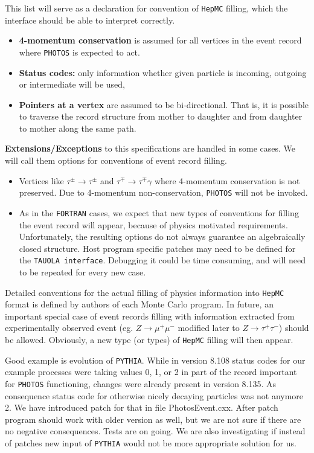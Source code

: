 \documentclass[]{Photos_interface_design}
\begin{document}
This list will serve as a declaration for convention of  {\tt HepMC} filling, which  the 
interface should  be able to interpret correctly.

\begin{itemize}
  \item \textbf{4-momentum conservation} is assumed for all vertices in the event record where {\tt PHOTOS} is expected to act.
  \item \textbf{Status codes:} only information whether given particle is incoming, outgoing or intermediate will be used,
  \item \textbf{Pointers at a vertex} are assumed to be bi-directional. That is, it is possible to traverse the record structure from mother to daughter and from daughter to mother along the same path.
\end{itemize}

\noindent
\textbf{ Extensions/Exceptions} to this specifications  are handled in some cases. We will call them
options for conventions of event record filling.
  \begin{itemize} 
    \item  Vertices like $\tau^\pm \rightarrow \tau^\pm$ and $\tau^\mp \rightarrow \tau^\mp \gamma$ 
           where 4-momentum conservation is not preserved. Due to 4-momentum non-conservation,
           {\tt PHOTOS} will not be invoked.
    \item
           As in the {\tt FORTRAN} cases, we expect that  new  types of 
           conventions for filling the event record
           will appear, because of physics motivated requirements.
           Unfortunately, the resulting options do not always guarantee
           an algebraically closed structure.  
           Host program specific patches  may need to be defined for the 
           {\tt TAUOLA interface}. 
           Debugging it could be time consuming, and will need to be repeated for every new
           case.
   \end{itemize}


Detailed
conventions for the actual filling of physics information into {\tt HepMC} format
is defined by authors of each Monte Carlo program.
 In future,  an important special case of event records filling with
information extracted from experimentally observed event (eg. $Z\to \mu^+\mu^-$
 modified later to $Z\to \tau^+\tau^-$) should be allowed.
  Obviously, a new type (or types) of {\tt HepMC} filling will then appear.

Good example is evolution of {\tt PYTHIA}. While in version 8.108 status codes for 
our example processes were  taking values 0, 1, or 2  in part of the record 
important for {\tt PHOTOS} functioning, changes were already present in
 version 8.135. As consequence status code for 
otherwise nicely decaying particles was not anymore 2. We have introduced 
patch for that in file PhotosEvent.cxx. After patch 
program should work with older version as well, but we are not sure if there 
are no negative consequences. Tests are on going. We are also investigating 
if instead of patches new input of {\tt PYTHIA} would not be more appropriate 
solution for us.
\end{document}
